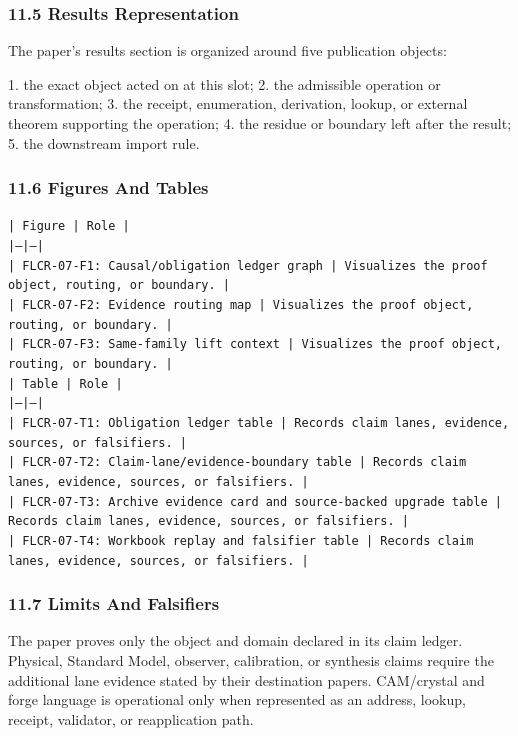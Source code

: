 \documentclass[11pt]{article}
\begin{document}
\subsubsection*{11.5 Results Representation}

The paper's results section is organized around five publication objects:

1. the exact object acted on at this slot;
2. the admissible operation or transformation;
3. the receipt, enumeration, derivation, lookup, or external theorem supporting
   the operation;
4. the residue or boundary left after the result;
5. the downstream import rule.

\subsubsection*{11.6 Figures And Tables}

\noindent\texttt{| Figure | Role |}\\
\noindent\texttt{|---|---|}\\
\noindent\texttt{| FLCR-07-F1: Causal/obligation ledger graph | Visualizes the proof object, routing, or boundary. |}\\
\noindent\texttt{| FLCR-07-F2: Evidence routing map | Visualizes the proof object, routing, or boundary. |}\\
\noindent\texttt{| FLCR-07-F3: Same-family lift context | Visualizes the proof object, routing, or boundary. |}\\

\noindent\texttt{| Table | Role |}\\
\noindent\texttt{|---|---|}\\
\noindent\texttt{| FLCR-07-T1: Obligation ledger table | Records claim lanes, evidence, sources, or falsifiers. |}\\
\noindent\texttt{| FLCR-07-T2: Claim-lane/evidence-boundary table | Records claim lanes, evidence, sources, or falsifiers. |}\\
\noindent\texttt{| FLCR-07-T3: Archive evidence card and source-backed upgrade table | Records claim lanes, evidence, sources, or falsifiers. |}\\
\noindent\texttt{| FLCR-07-T4: Workbook replay and falsifier table | Records claim lanes, evidence, sources, or falsifiers. |}\\

\subsubsection*{11.7 Limits And Falsifiers}

The paper proves only the object and domain declared in its claim ledger.
Physical, Standard Model, observer, calibration, or synthesis claims require
the additional lane evidence stated by their destination papers. CAM/crystal
and forge language is operational only when represented as an address, lookup,
receipt, validator, or reapplication path.
\end{document}
